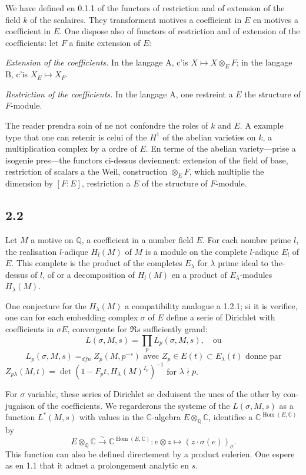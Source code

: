 \documentclass[12pt,a4paper]{article}
\theoremstyle{plain}
\theoremstyle{definition}
\theoremstyle{remark}
\DeclareMathOperator{\Hom}{Hom}
\newcommand{\Q}{\mathbb{Q}}
\newcommand{\C}{\mathbb{C}}
\begin{document}
We have defined en 0.1.1 of the functors of restriction and of extension of the field $k$
of the scalaires. They transforment motives a coefficient in $E$ en motives a coefficient in
$E$. One dispose also of functors of restriction and of extension of the coefficients: let
$F$ a finite extension of $E$:

\textit{Extension of the coefficients.} In the langage A, c'is $X \mapsto X \otimes_E F$; in the
langage B, c'is $X_E \mapsto X_F$.

\textit{Restriction of the coefficients.} In the langage A, one restreint a $E$ the structure of
$F$-module.

The reader prendra soin of ne not confondre the roles of $k$ and $E$. A example type
that one can retenir is celui of the $H^1$ of the abelian varieties on $k$, a multiplication
complex by a ordre of $E$. En terme of the abelian variety---prise a isogenie
pres---the functors ci-dessus deviennent: extension of the field of base, restriction of scalars a the Weil, construction $\otimes_E F$, which multiplie the dimension by $[F:E]$,
restriction a $E$ of the structure of $F$-module.

\subsection*{2.2}

Let $M$ a motive on $\Q$, a coefficient in a number field $E$. For each
nombre prime $l$, the realisation $l$-adique $H_l(M)$ of $M$ is a module on the complete
$l$-adique $E_l$ of $E$. This complete is the product of the completes $E_\lambda$ for $\lambda$
prime ideal to the-dessus of $l$, of or a decomposition of $H_l(M)$ en a product of
$E_\lambda$-modules $H_\lambda(M)$.

One conjecture for the $H_\lambda(M)$ a compatibility analogue a 1.2.1; si it is
verifiee, one can for each embedding complex $\sigma$ of $E$ define a serie of
Dirichlet with coefficients in $\sigma E$, convergente for $\Re s$ sufficiently grand:
\[
L(\sigma, M, s) = \prod_p L_p(\sigma, M, s), \quad \text{ou}
\]
\begin{equation}\label{eq:2.2.1}
L_p(\sigma, M, s) =_{dfn} Z_p(M, p^{-s}) \text{ avec } Z_p \in E(t) \subset E_\lambda(t)
\text{ donne par}
\end{equation}
$Z_{p\lambda}(M, t) = \det(1 - F_p t, H_\lambda(M)^{I_p})^{-1}$ for $\lambda \nmid p$.

For $\sigma$ variable, these series of Dirichlet se deduisent the unes of the other by con-
jugaison of the coefficients. We regarderons the systeme of the $L(\sigma, M, s)$ as a
function $L^*(M, s)$ with values in the $\C$-algebra $E \otimes_\Q \C$, identifiee a $\C^{\Hom(E,\C)}$ by
\begin{equation}\label{eq:2.2.2}
E \otimes_\Q \C \xrightarrow{\sim} \C^{\Hom(E,\C)}: e \otimes z \mapsto (z \cdot \sigma(e))_\sigma.
\end{equation}
This function can also be defined directement by a product eulerien. One espere
as en 1.1 that it admet a prolongement analytic en $s$.
\end{document}
